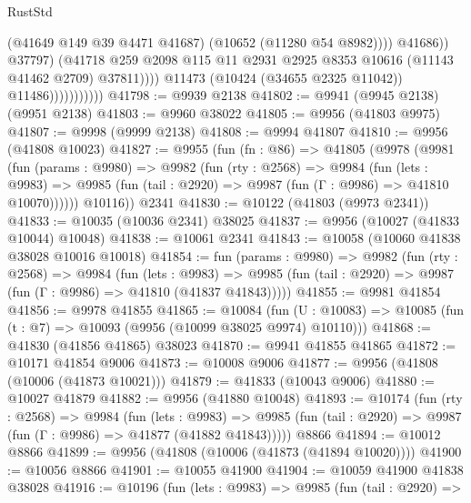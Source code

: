 \begin{lexlean}{RustStd}
\begin{coremodule}
                                          (@41649 @149 @39 @4471 @41687)
                                          (@10652 (@11280 @54 @8982))))
                                      @41686))
                                  @37797)
                                (@41718
                                  @259
                                  @2098
                                  @115
                                  @11
                                  @2931
                                  @2925
                                  @8353
                                  @10616
                                  (@11143 @41462 @2709)
                                  @37811))))
                          @11473
                          (@10424 (@34655 @2325 @11042))
                          @11486)))))))))))
@41798 := @9939 @2138
@41802 := @9941 (@9945 @2138) (@9951 @2138)
@41803 := @9960 @38022
@41805 := @9956 (@41803 @9975)
@41807 := @9998 (@9999 @2138)
@41808 := @9994 @41807
@41810 := @9956 (@41808 @10023)
@41827 := @9955
    (fun (fn : @86) =>
    @41805
      (@9978
        (@9981
          (fun (params : @9980) =>
          @9982
            (fun (rty : @2568) =>
            @9984
              (fun (lets : @9983) =>
              @9985 (fun (tail : @2920) => @9987 (fun (Γ : @9986) => @41810 @10070))))))
        @10116))
    @2341
@41830 := @10122 (@41803 (@9973 @2341))
@41833 := @10035 (@10036 @2341) @38025
@41837 := @9956 (@10027 (@41833 @10044) @10048)
@41838 := @10061 @2341
@41843 := @10058 (@10060 @41838 @38028 @10016 @10018)
@41854 := fun (params : @9980) =>
  @9982
    (fun (rty : @2568) =>
    @9984
      (fun (lets : @9983) =>
      @9985 (fun (tail : @2920) => @9987 (fun (Γ : @9986) => @41810 (@41837 @41843)))))
@41855 := @9981 @41854
@41856 := @9978 @41855
@41865 := @10084
    (fun (U : @10083) => @10085 (fun (t : @7) => @10093 (@9956 (@10099 @38025 @9974) @10110)))
@41868 := @41830 (@41856 @41865) @38023
@41870 := @9941 @41855 @41865
@41872 := @10171 @41854 @9006
@41873 := @10008 @9006
@41877 := @9956 (@41808 (@10006 (@41873 @10021)))
@41879 := @41833 (@10043 @9006)
@41880 := @10027 @41879
@41882 := @9956 (@41880 @10048)
@41893 := @10174
    (fun (rty : @2568) =>
    @9984
      (fun (lets : @9983) =>
      @9985 (fun (tail : @2920) => @9987 (fun (Γ : @9986) => @41877 (@41882 @41843)))))
    @8866
@41894 := @10012 @8866
@41899 := @9956 (@41808 (@10006 (@41873 (@41894 @10020))))
@41900 := @10056 @8866
@41901 := @10055 @41900
@41904 := @10059 @41900 @41838 @38028
@41916 := @10196
    (fun (lets : @9983) =>
    @9985
      (fun (tail : @2920) =>

\end{coremodule}
\end{lexlean}
